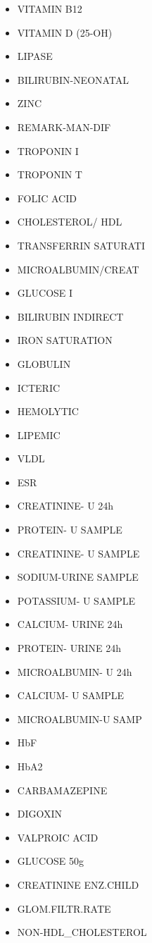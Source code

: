 \documentclass[a4paper,12pt]{article}
\begin{document}
\begin{appendices}
\begin{itemize}
   			\item VITAMIN B12
   			\item VITAMIN D (25-OH)
   			\item LIPASE
   			\item BILIRUBIN-NEONATAL
   			\item ZINC
   			\item REMARK-MAN-DIF
   			\item TROPONIN I
   			\item TROPONIN T
   			\item FOLIC ACID
   			\item CHOLESTEROL/ HDL
   			\item TRANSFERRIN SATURATI
   			\item MICROALBUMIN/CREAT
   			\item GLUCOSE I
   			\item BILIRUBIN INDIRECT
   			\item IRON SATURATION
   			\item GLOBULIN
   			\item ICTERIC
   			\item HEMOLYTIC
   			\item LIPEMIC
   			\item VLDL
   			\item ESR
   			\item CREATININE- U 24h
   			\item PROTEIN- U SAMPLE
   			\item CREATININE- U SAMPLE
   			\item SODIUM-URINE SAMPLE
   			\item POTASSIUM- U SAMPLE
   			\item CALCIUM- URINE 24h
   			\item PROTEIN- URINE 24h
   			\item MICROALBUMIN- U 24h
   			\item CALCIUM- U SAMPLE
   			\item MICROALBUMIN-U SAMP
   			\item HbF
   			\item HbA2
   			\item CARBAMAZEPINE
   			\item DIGOXIN
   			\item VALPROIC ACID
   			\item GLUCOSE 50g
   			\item CREATININE ENZ.CHILD
   			\item GLOM.FILTR.RATE
   			\item NON-HDL\_CHOLESTEROL

\end{itemize}
\end{appendices}
\end{document}
